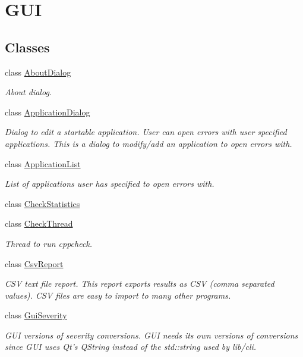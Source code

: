\hypertarget{group___g_u_i}{\section{G\-U\-I}
\label{group___g_u_i}
}
\subsection*{Classes}
\begin{DoxyCompactItemize}
\item 
class \hyperlink{class_about_dialog}{About\-Dialog}
\begin{DoxyCompactList}\small\item\em About dialog. \end{DoxyCompactList}\item 
class \hyperlink{class_application_dialog}{Application\-Dialog}
\begin{DoxyCompactList}\small\item\em Dialog to edit a startable application. User can open errors with user specified applications. This is a dialog to modify/add an application to open errors with. \end{DoxyCompactList}\item 
class \hyperlink{class_application_list}{Application\-List}
\begin{DoxyCompactList}\small\item\em List of applications user has specified to open errors with. \end{DoxyCompactList}\item 
class \hyperlink{class_check_statistics}{Check\-Statistics}
\item 
class \hyperlink{class_check_thread}{Check\-Thread}
\begin{DoxyCompactList}\small\item\em Thread to run cppcheck. \end{DoxyCompactList}\item 
class \hyperlink{class_csv_report}{Csv\-Report}
\begin{DoxyCompactList}\small\item\em C\-S\-V text file report. This report exports results as C\-S\-V (comma separated values). C\-S\-V files are easy to import to many other programs. \end{DoxyCompactList}\item 
class \hyperlink{class_gui_severity}{Gui\-Severity}
\begin{DoxyCompactList}\small\item\em G\-U\-I versions of severity conversions. G\-U\-I needs its own versions of conversions since G\-U\-I uses Qt's Q\-String instead of the std\-::string used by lib/cli. \end{DoxyCompactList}\item 

\end{DoxyCompactItemize}
